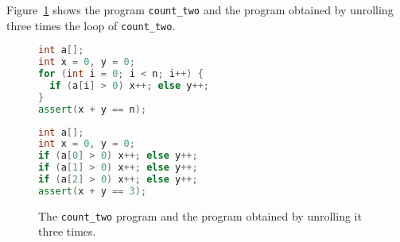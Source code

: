 %
Figure~\ref{fig:examples/count_two} shows the
program \verb'count_two' and the program obtained by unrolling three times the loop of \verb'count_two'.

\begin{figure}[ht]
\begin{minipage}{.515\textwidth}
  {\begin{lstlisting}[language=cpp]
int a[];
int x = 0, y = 0;
for (int i = 0; i < n; i++) {
  if (a[i] > 0) x++; else y++;
}
assert(x + y == n);
\end{lstlisting}}
\end{minipage}%
\hspace{1pt}
\begin{minipage}{.48\textwidth}
  {\begin{lstlisting}[language=cpp]
int a[];
int x = 0, y = 0;
if (a[0] > 0) x++; else y++;
if (a[1] > 0) x++; else y++;
if (a[2] > 0) x++; else y++;
assert(x + y == 3);
\end{lstlisting}}
\end{minipage}
  \caption{The \texttt{count\_two} program and the program obtained by unrolling it three times.}
  \label{fig:examples/count_two}
\end{figure}

